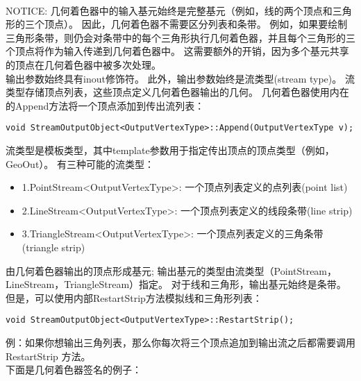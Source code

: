\begin{flushleft}
~\\
NOTICE: 几何着色器中的输入基元始终是完整基元（例如，线的两个顶点和三角形的三个顶点）。 因此，几何着色器不需要区分列表和条带。 例如，如果要绘制三角形条带，则仍会对条带中的每个三角形执行几何着色器，并且每个三角形的三个顶点将作为输入传递到几何着色器中。 这需要额外的开销，因为多个基元共享的顶点在几何着色器中被多次处理。
~\\
输出参数始终具有inout修饰符。 此外，输出参数始终是流类型(stream type)。 流类型存储顶点列表，这些顶点定义几何着色器输出的几何。 几何着色器使用内在的Append方法将一个顶点添加到传出流列表：\\
\end{flushleft}

\begin{lstlisting}
void StreamOutputObject<OutputVertexType>::Append(OutputVertexType v);
\end{lstlisting}

\begin{flushleft}
流类型是模板类型，其中template参数用于指定传出顶点的顶点类型（例如，GeoOut）。 有三种可能的流类型：\\
\end{flushleft}

\begin{itemize}
  \item 1.PointStream<OutputVertexType>: 一个顶点列表定义的点列表(point list)
  \item 2.LineStream<OutputVertexType>: 一个顶点列表定义的线段条带(line strip)
  \item 3.TriangleStream<OutputVertexType>: 一个顶点列表定义的三角条带(triangle strip)
\end{itemize}

\begin{flushleft}
由几何着色器输出的顶点形成基元; 输出基元的类型由流类型（PointStream，LineStream，TriangleStream）指定。 对于线和三角形，输出基元始终是条带。 但是，可以使用内部RestartStrip方法模拟线和三角形列表：\\
\end{flushleft}

\begin{lstlisting}
void StreamOutputObject<OutputVertexType>::RestartStrip();
\end{lstlisting}

\begin{flushleft}
例：如果你想输出三角列表，那么你每次将三个顶点追加到输出流之后都需要调用 RestartStrip 方法。\\

下面是几何着色器签名的例子：\\
\end{flushleft}

